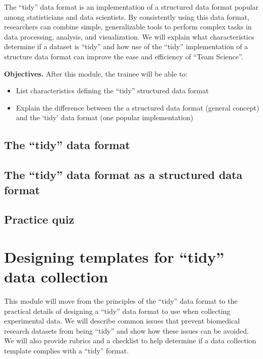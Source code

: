 \documentclass[]{tufte-book}
\providecommand{\tightlist}{%
  \setlength{\itemsep}{0pt}\setlength{\parskip}{0pt}}
\begin{document}
The ``tidy'' data format is an implementation of a structured data format popular
among statisticians and data scientists. By consistently using this data format,
researchers can combine simple, generalizable tools to perform complex tasks in
data processing, analysis, and visualization. We will explain what
characteristics determine if a dataset is ``tidy'' and how use of the ``tidy''
implementation of a structure data format can improve the ease and efficiency of
``Team Science''.

\textbf{Objectives.} After this module, the trainee will be able to:

\begin{itemize}
\tightlist
\item
  List characteristics defining the ``tidy'' structured data format
\item
  Explain the difference between the a structured data format (general concept)
  and the `tidy' data format (one popular implementation)
\end{itemize}

\hypertarget{the-tidy-data-format-1}{%
\subsection{The ``tidy'' data format}\label{the-tidy-data-format-1}}

\hypertarget{the-tidy-data-format-as-a-structured-data-format}{%
\subsection{The ``tidy'' data format as a structured data format}\label{the-tidy-data-format-as-a-structured-data-format}}

\hypertarget{practice-quiz}{%
\subsection{Practice quiz}\label{practice-quiz}}

\hypertarget{designing-templates-for-tidy-data-collection}{%
\section{Designing templates for ``tidy'' data collection}\label{designing-templates-for-tidy-data-collection}}

This module will move from the principles of the ``tidy'' data format to the
practical details of designing a ``tidy'' data format to use when collecting
experimental data. We will describe common issues that prevent biomedical
research datasets from being ``tidy'' and show how these issues can be avoided. We
will also provide rubrics and a checklist to help determine if a data collection
template complies with a ``tidy'' format.
\end{document}
